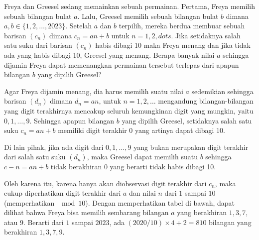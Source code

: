 \documentclass[12pt]{scrartcl}
\begin{document}
\begin{soaljawab}
    Freya dan Greesel sedang memainkan sebuah permainan. Pertama, Freya memilih sebuah bilangan bulat $a$. Lalu, Greesel memilih sebuah bilangan bulat $b$ dimana $a,b \in \{1,2,\dots,2023\}$. Setelah $a$ dan $b$ terpilih, mereka berdua membuar sebuah barisan $(c_n)$ dimana $c_n = an + b$ untuk $n = 1,2,dots$. Jika setidaknya salah satu suku dari barisan $(c_n)$ habis dibagi 10 maka Freya menang dan jika tidak ada yang habis dibagi 10, Greesel yang menang. Berapa banyak nilai $a$ sehingga dijamin Freya dapat memenangkan permainan tersebut terlepas dari apapun bilangan $b$ yang dipilih Greesel?
    
    \begin{solusi}
        Agar Freya dijamin menang, dia harus memilih suatu nilai $a$ sedemikian sehingga barisan $(d_n)$ dimana $d_n=an$, untuk $n=1,2,\dots$ mengandung bilangan-bilangan yang digit terakhirnya mencakup seluruh kemungkinan digit yang mungkin, yaitu $0,1,\dots,9$. Sehingga apapun bilangan $b$ yang dipilih Greesel, setidaknya salah satu suku $c_n = an+b$ memiliki digit terakhir $0$ yang artinya dapat dibagi 10. 

        Di lain pihak, jika ada digit dari $0,1,\dots,9$ yang bukan merupakan digit terakhir dari salah satu suku $(d_n)$, maka Greesel dapat memilih suatu $b$ sehingga $c-n=an+b$ tidak berakhiran $0$ yang berarti tidak habis dibagi 10. 
        
        Oleh karena itu, karena hanya akan diobservasi digit terakhir dari $c_n$, maka cukup diperhatikan digit terakhir dari $a$ dan nilai $n$ dari $1$ sampai $10$ (memperhatikan $\mod 10$). Dengan memperhatikan tabel di bawah, dapat dilihat bahwa Freya bisa memilih sembarang bilangan $a$ yang berakhiran $1,3,7$, atau $9$. Berarti dari $1$ sampai $2023$, ada $(2020/10) \times 4 + 2 = \boxed{810}$ bilangan yang berakhiran $1,3,7,9$.



\end{solusi}
\end{soaljawab}
\end{document}
